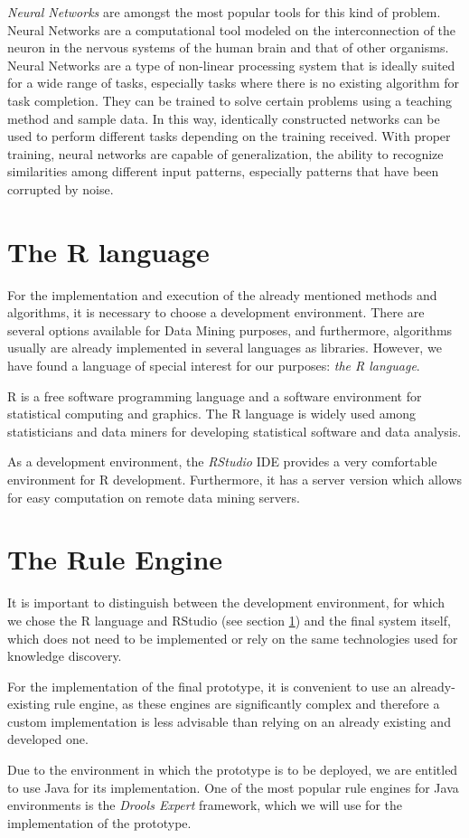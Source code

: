 \emph{Neural Networks}\cite{rojas1996neural} are amongst the most popular tools for this kind of problem. Neural Networks are a computational tool modeled on the interconnection of the neuron in the nervous systems of the human brain and that of other organisms. Neural Networks are a type of non-linear processing system that is ideally suited for a wide range of tasks, especially tasks where there is no existing algorithm for task completion. They can be trained to solve certain problems using a teaching method and sample data. In this way, identically constructed networks can be used to perform different tasks depending on the training received. With proper training, neural networks are capable of generalization, the ability to recognize similarities among different input patterns, especially patterns that have been corrupted by noise.

\section{The R language}
\label{sec:the_r_language}
For the implementation and execution of the already mentioned methods and algorithms, it is necessary to choose a development environment. There are several options available for Data Mining purposes, and furthermore, algorithms usually are already implemented in several languages as libraries. However, we have found a language of special interest for our purposes: \emph{the R language}\cite{ihaka1996r}.

R is a free software programming language and a software environment for statistical computing and graphics. The R language is widely used among statisticians and data miners for developing statistical software and data analysis\cite{vance2009data,quick2010statistical}.

As a development environment, the \emph{RStudio}\cite{racine2012rstudio} IDE provides a very comfortable environment for R development. Furthermore, it has a server version which allows for easy computation on remote data mining servers. 

\section{The Rule Engine}
It is important to distinguish between the development environment, for which we chose the R language and RStudio (see section \ref{sec:the_r_language}) and the final system itself, which does not need to be implemented or rely on the same technologies used for knowledge discovery.

For the implementation of the final prototype, it is convenient to use an already-existing rule engine\cite{liang2009openrulebench}, as these engines are significantly complex and therefore a custom implementation is less advisable than relying on an already existing and developed one.

Due to the environment in which the prototype is to be deployed, we are entitled to use Java for its implementation. One of the most popular rule engines for Java environments is the \emph{Drools Expert}\cite{browne2009jboss,proctor2007relational} framework, which we will use for the implementation of the prototype.